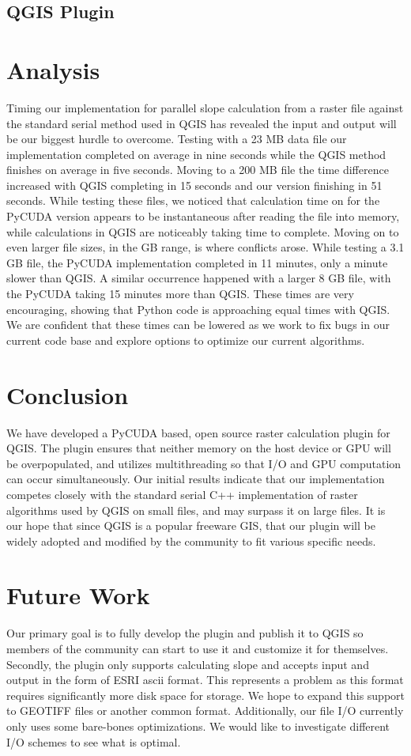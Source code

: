 \documentclass[journal]{IEEEtran}
\begin{document}
    \subsection{QGIS Plugin}

\section{Analysis}
Timing our implementation for parallel slope calculation from a raster file
against the standard serial method used in QGIS has revealed the input and
output will be our biggest hurdle to overcome. Testing with a 23 MB data file
our implementation completed on average in nine seconds while the QGIS method
finishes on average in five seconds. Moving to a 200 MB file the time
difference increased with QGIS completing in 15 seconds and our version
finishing in 51 seconds. While testing these files, we noticed that calculation
time on for the PyCUDA version appears to be instantaneous after reading the
file into memory, while calculations in QGIS are noticeably taking time to
complete. Moving on to even larger file sizes, in the GB range, is where
conflicts arose. While testing  a 3.1 GB file, the PyCUDA implementation completed
in 11 minutes, only a minute slower than QGIS. A similar occurrence happened with
a larger 8 GB file, with the PyCUDA taking 15 minutes more than QGIS. These times
are very encouraging, showing that Python code is approaching equal times with QGIS.
We are confident that these times can be lowered as we work to fix bugs in our
current code base and explore options to optimize our current algorithms.

\section{Conclusion}
We have developed a PyCUDA based, open source raster calculation plugin for
QGIS. The plugin ensures that neither memory on the host device or GPU will be
overpopulated, and utilizes multithreading so that I/O and GPU computation can
occur simultaneously. Our initial results indicate that our implementation
competes closely with the standard serial C++ implementation of raster
algorithms used by QGIS on small files, and may surpass it on large files.  It
is our hope that since QGIS is a popular freeware GIS, that our plugin will be
widely adopted and modified by the community to fit various specific needs.

\section{Future Work}
Our primary goal is to fully develop the plugin and publish it to QGIS so
members of the community can start to use it and customize it for themselves.
Secondly, the plugin only supports calculating slope and accepts input and
output in the form of ESRI ascii format. This represents a problem as this
format requires significantly more disk space for storage. We hope to expand
this support to GEOTIFF files or another common format. Additionally, our file
I/O currently only uses some bare-bones optimizations. We would like to
investigate different I/O schemes to see what is optimal.
\end{document}
